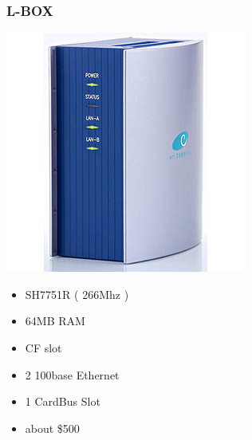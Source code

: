 \documentclass[cjk,dvipdfm,12pt]{beamer}
\begin{document}
\begin{frame}
 \frametitle{L-BOX}
 \begin{minipage}[t]{0.4\hsize}
  \includegraphics[width=1.0\hsize]{image200705/lbox.jpg}
 \end{minipage} 
 \begin{minipage}[t]{0.5\hsize}
  \begin{itemize}
   \item SH7751R ( 266Mhz )
   \item 64MB RAM 
   \item CF slot 
   \item 2 100base Ethernet
   \item 1 CardBus Slot
   \item about \$500 
  \end{itemize}
 \end{minipage}
\end{frame}
\end{document}
